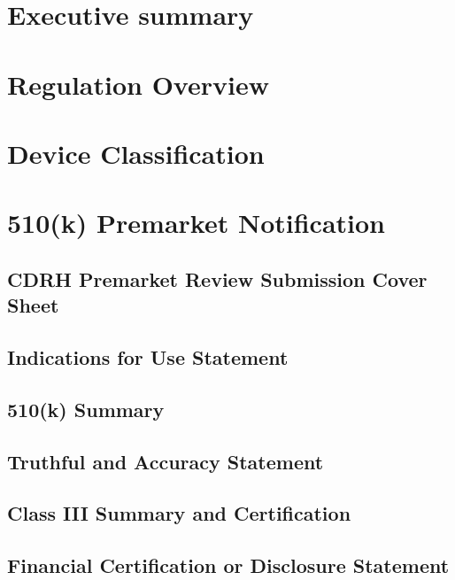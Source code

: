 \documentclass{article}
\begin{document}

\setcounter{tocdepth}{3}
\tableofcontents
\newpage

\section*{Executive summary}
\label{sec:exec-summary}

\section{Regulation Overview}
\label{sec:test-administration}

\section{Device Classification}
\label{sec:protocols}

\section{510(k) Premarket Notification}
\label{sec:protocols}
\subsection{CDRH Premarket Review Submission Cover Sheet}



\subsection{Indications for Use Statement}
\subsection{510(k) Summary}
\subsection{Truthful and Accuracy Statement}
\subsection{Class III Summary and Certification}
\subsection{Financial Certification or Disclosure Statement}
\end{document}
